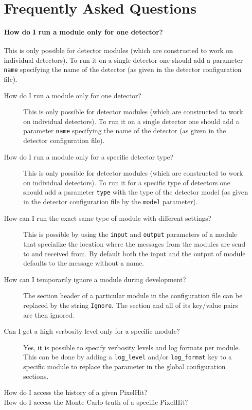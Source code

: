\section{Frequently Asked Questions}
\label{sec:faq}
\paragraph{How do I run a module only for one detector?}
This is only possible for detector modules (which are constructed to work on individual detectors). To run it on a single detector one should add a parameter \texttt{name} specifying the name of the detector (as given in the detector configuration file).

\begin{description}
\item[How do I run a module only for one detector?] This is only possible for detector modules (which are constructed to work on individual detectors). To run it on a single detector one should add a parameter \texttt{name} specifying the name of the detector (as given in the detector configuration file).
\item[How do I run a module only for a specific detector type?] This is only possible for detector modules (which are constructed to work on individual detectors). To run it for a specific type of detectors one should add a parameter \texttt{type} with the type of the detector model (as given in the detector configuration file by the \texttt{model} parameter).
\item[How can I run the exact same type of module with different settings?] This is possible by using the \texttt{input} and \texttt{output} parameters of a module that specialize the location where the messages from the modules are send to and received from. By default both the input and the output of module defaults to the message without a name.
\item[How can I temporarily ignore a module during development?] The section header of a particular module in the configuration file can be replaced by the string \texttt{Ignore}. The section and all of its key/value pairs are then ignored.
\item[Can I get a high verbosity level only for a specific module?]   Yes, it is possible to specify verbosity levels and log formats per module. This can be done by adding a \texttt{log\_level} and/or \texttt{log\_format} key to a specific module to replace the parameter in the global configuration sections.
\item[How do I access the history of a given PixelHit?] 
\item[How do I access the Monte Carlo truth of a specific PixelHit?] 
\end{description}

